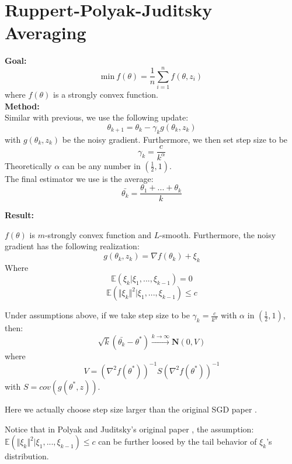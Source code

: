 

\section{Ruppert-Polyak-Juditsky Averaging}

\textbf{Goal:}
$$
\mathrm{min} \  f(\theta) = \frac{1}{n}\sum_{i=1}^{n}f(\theta, z_i)
$$
where $f(\theta)$ is a strongly convex function. \\

\textbf{Method:}\\
Similar with previous, we use the following update:
$$
\theta_{k+1} = \theta_k - \gamma_kg(\theta_k,z_k)
$$
with $g(\theta_k,z_k)$ be the noisy gradient. Furthermore, we then set step size to be
$$
\gamma_k = \frac{c}{k^\alpha}
$$
Theoretically $\alpha$ can be any number in $(\frac{1}{2}, 1)$.\\



The final estimator we use is the average:
$$
\bar{\theta_k} = \frac{\theta_1 + ... + \theta_k}{k}
$$


\textbf{Result:}\\

\begin{assumption}
	$f(\theta)$ is $m$-strongly convex function and $L$-smooth. Furthermore, the noisy gradient has the following realization:
$$
g(\theta_k, z_k) = \nabla f(\theta_k) + \xi_k
$$
Where
$$
\mathbb{E}(\xi_k|\xi_1,...,\xi_{k-1}) = 0
$$
$$
\mathbb{E}(\Vert \xi_k\Vert^2|\xi_1,...,\xi_{k-1}) \leq c
$$
\end{assumption}

\begin{theorem}
Under assumptions above, if we take step size to be $\gamma_k = \frac{c}{k^\alpha}$ with $\alpha$ in $(\frac{1}{2}, 1)$, then:
$$
\sqrt{k}(\bar{\theta_k} - \theta^*) \xrightarrow{k \rightarrow \infty} \mathbf{N}(0,V)
$$
where
$$
V = (\nabla^2f(\theta^*))^{-1}S(\nabla^2f(\theta^*))^{-1}
$$
with $S = cov(g(\theta^*,z))$.
\end{theorem}

Here we actually choose step size larger than the original SGD paper \cite{RM51}.



Notice that in Polyak and Juditsky's original paper \cite{PJ92}, the assumption: $\mathbb{E}(\Vert \xi_k\Vert^2|\xi_1,...,\xi_{k-1}) \leq c$ can be further loosed by the tail behavior of $\xi_k$'s distribution.\\

